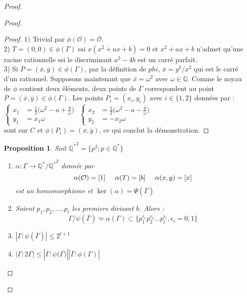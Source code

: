 \documentclass[a4paper]{article}
\newtheorem{prop}{Proposition}
\begin{document}
\begin{proof}
\begin{proof}
\begin{proof}
$1)$ Trivial par $\phi(\mathcal{O})=\overline{\mathcal{O}}$. \\
2)  $\overline{T}=(0,0) \in \phi(\Gamma)$ ssi $x(x^2+ax+b)=0$ et $x^2+ax+b$ n'admet qu'une racine rationnelle ssi le discriminant $a^2-4b$ est un carré parfait. \\
3) Si $\overline{P}=(\overline{x},\overline{y}) \in \phi(\Gamma)$, par la définition de $phi$, $\overline{x}=y^2/x^2$ qui est le carré d'un rationnel.
Supposons maintenant que $\overline{x}=\omega^2$ avec $\omega \in \mathbb{Q}$.
Comme le noyau de $\phi$ contient deux éléments, deux points de $\Gamma$ correspondent au point $\overline{P}=(\overline{x},\overline{y}) \in \phi(\Gamma)$. Les points $P_{i}=(x_{i},y_{i})$ avec $i \in \{1,2\}$ données par : \\
$\left\{
\begin{array}{rl}
 x_{1}&=\frac{1}{2}\Big(\omega^2-a+\frac{\overline{y}}{\omega}\Big) \\
y_{1}&= x_{1}\omega
\end{array}
\right.$
\hspace{1.5cm}
$\left\{
\begin{array}{rl}
x_{2}&=\frac{1}{2}\Big(\omega^2-a-\frac{\overline{y}}{\omega}\Big) \\
y_{2}&=-x_{2}\omega
\end{array}
\right.$ \\
sont sur $C$ et $\phi(P_{i})=(\overline{x},\overline{y})$, ce qui conclut la démonstration.
\end{proof}

\begin{prop}
Soit $\mathbb{Q^*}^2=\{p^2 ; p \in \mathbb{Q^*}\} $
\begin{enumerate}
\item $\alpha : \Gamma \rightarrow \mathbb{Q^*}/\mathbb{Q^*}^2$ 
donnée par \begin{equation*}
\alpha(\mathcal{O})=[1] \hspace{0.5cm}\alpha(T)=[b]\hspace{0.5cm} \alpha(x,y)=[x]
 \end{equation*}
 est un homomorphisme et $\ker(\alpha)=\Psi(\overline{\Gamma})$ 
\item Soient $p_{1},p_{2},...,p_{t}$ les premiers divisant $b$. Alors :
\begin{equation*}
\Gamma /\psi(\overline{\Gamma}) \simeq \alpha(\Gamma) \subset \{p_{1}^{\epsilon_{1}}
p_{2}^{\epsilon_{2}}...p_{t}^{\epsilon_{t}}, \epsilon_{i}=0,1 \}
\end{equation*}
\item $|\Gamma : \psi(\bar{\Gamma})| \leqslant 2^{t+1}$
\item $|\Gamma : 2\Gamma|\leqslant |\Gamma : \psi(\overline{\Gamma)}| |\overline{\Gamma}:\phi(\Gamma)| $
\end{enumerate}
\end{prop}


\end{proof}
\end{proof}
\end{document}
